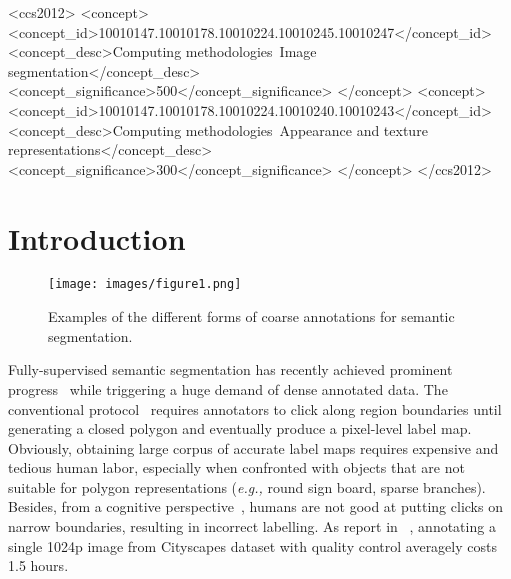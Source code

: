 \documentclass[sigconf]{acmart}
\begin{document}
%

\begin{CCSXML}
	<ccs2012>
	<concept>
	<concept_id>10010147.10010178.10010224.10010245.10010247</concept_id>
	<concept_desc>Computing methodologies~Image segmentation</concept_desc>
	<concept_significance>500</concept_significance>
	</concept>
	<concept>
	<concept_id>10010147.10010178.10010224.10010240.10010243</concept_id>
	<concept_desc>Computing methodologies~Appearance and texture representations</concept_desc>
	<concept_significance>300</concept_significance>
	</concept>
	</ccs2012>
\end{CCSXML}





\maketitle

\section{Introduction}
\begin{figure}[!htb]
	\centering
	\texttt{[image: images/figure1.png]}\\
	\caption{Examples of the different forms of coarse annotations for semantic segmentation. }
	\label{fig:example}
\end{figure}
Fully-supervised semantic segmentation has recently achieved prominent progress~\cite{DBLP:conf/cvpr/BertasiusTYS17,DBLP:conf/cvpr/LiLLLT17,fcn,deeplab,pspnet} while triggering a huge demand of dense annotated data. The conventional protocol~\cite{cityscapes,pascalvoc} requires annotators to click along region boundaries until generating a closed polygon and eventually produce a pixel-level label map. Obviously, obtaining large corpus of accurate label maps requires expensive and tedious human labor, especially when confronted with objects that are not suitable for polygon representations (\textit{e.g.,} round sign board, sparse branches). Besides, from a cognitive perspective~\cite{extreme}, humans are not good at putting clicks on narrow boundaries, resulting in incorrect labelling. As report in ~\cite{cityscapes}, annotating a single 1024p image from Cityscapes dataset with quality control averagely costs 1.5 hours.
\end{document}
